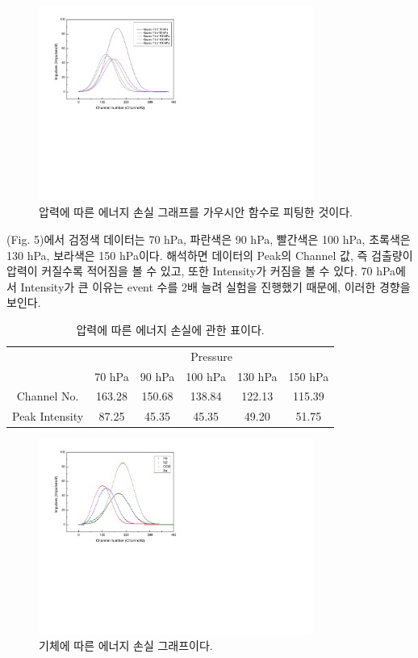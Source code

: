 \documentclass[a4paper, 10pt, nanum]{CSUniSchoolLabReport}
\begin{document}
	\begin{figure}[htb!]
		\centering
		\includegraphics[viewport=1mm 99mm 180mm 200mm, width=9cm, clip=true]{fig5.pdf}
		\caption{압력에 따른 에너지 손실 그래프를 가우시안 함수로 피팅한 것이다.}
		\label{fig:5}
	\end{figure}

	(Fig. 5)에서 검정색 데이터는 70 hPa, 파란색은 90  hPa, 빨간색은 100 hPa, 초록색은 130 hPa, 보라색은 150 hPa이다. 해석하면 데이터의 Peak의 Channel 값, 즉 검출량이 압력이 커질수록 적어짐을 볼 수 있고, 또한 Intensity가 커짐을 볼 수 있다. 70 hPa에서 Intensity가 큰 이유는 event 수를 2배 늘려 실험을 진행했기 때문에, 이러한 경향을 보인다.

	\begin{table}[htb!]
		\label{tab:2}
		\centering
		\caption{압력에 따른 에너지 손실에 관한 표이다.}
		\begin{tabular}{c|ccccc}
			\noalign{\smallskip}\noalign{\smallskip}\hline\hline
			\multirow{2}{*}{Data} &  \multicolumn{5}{c}{Pressure} \\
			\cline{2-6}
				& 70 hPa & 90 hPa & 100 hPa & 130 hPa & 150 hPa \\
			\hline
				Channel No. & 163.28 & 150.68 & 138.84 & 122.13 & 115.39 \\
				Peak Intensity & 87.25 & 45.35 & 45.35 & 49.20 & 51.75 \\
			\hline
			\hline
		\end{tabular}
	\end{table}

	\begin{figure}[htb!]
		\centering
		\includegraphics[viewport=1mm 99mm 180mm 200mm, width=9cm, clip=true]{fig6.pdf}
		\caption{기체에 따른 에너지 손실 그래프이다.}
		\label{fig:6}
	\end{figure}
\end{document}

